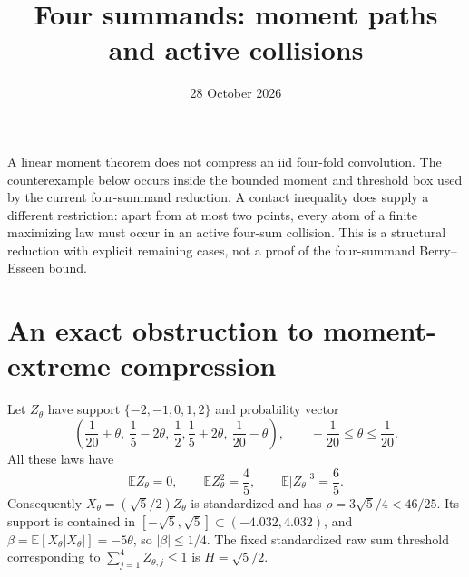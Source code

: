 \documentclass[11pt,a4paper]{article}
\title{Four summands: moment paths and active collisions}
\author{}\date{28 October 2026}
\newcommand{\E}{\mathbb E}\newcommand{\Pp}{\mathbb P}
\begin{document}
\maketitle

A linear moment theorem does not compress an iid four-fold convolution.
The counterexample below occurs inside the bounded moment and threshold
box used by the current four-summand reduction. A contact inequality does
supply a different restriction: apart from at most two points, every atom
of a finite maximizing law must occur in an active four-sum collision.
This is a structural reduction with explicit remaining cases, not a proof
of the four-summand Berry--Esseen bound.

\section{An exact obstruction to moment-extreme compression}
Let $Z_\theta$ have support $\{-2,-1,0,1,2\}$ and probability vector
\begin{equation}\label{eq:family}
 \left(\frac1{20}+\theta,\ \frac15-2\theta,\ \frac12,
              \frac15+2\theta,\ \frac1{20}-\theta\right),
 \qquad -\frac1{20}\le\theta\le\frac1{20}.
\end{equation}
All these laws have
\[
 \E Z_\theta=0,\qquad \E Z_\theta^2=\frac45,
 \qquad \E|Z_\theta|^3=\frac65.
\]
Consequently $X_\theta=(\sqrt5/2)Z_\theta$ is standardized and has
$\rho=3\sqrt5/4<46/25$. Its support is contained in
$[-\sqrt5,\sqrt5]\subset(-4.032,4.032)$, and
$\beta=\E[X_\theta|X_\theta|]=-5\theta$, so $|\beta|\le1/4$.
The fixed standardized raw sum threshold corresponding to
$\sum_{j=1}^4Z_{\theta,j}\le1$ is $H=\sqrt5/2$.
\end{document}
